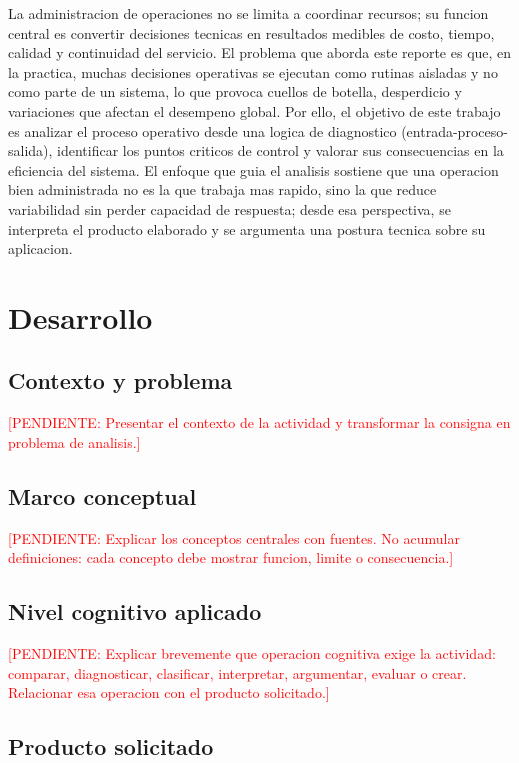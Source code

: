 \documentclass[
	spanish,
	letterpaper, oneside
]{article}
\newcommand{\pendiente}[1]{\textcolor{red}{[PENDIENTE: #1]}}
\begin{document}
La administracion de operaciones no se limita a coordinar recursos; su funcion central es convertir decisiones tecnicas en resultados medibles de costo, tiempo, calidad y continuidad del servicio. El problema que aborda este reporte es que, en la practica, muchas decisiones operativas se ejecutan como rutinas aisladas y no como parte de un sistema, lo que provoca cuellos de botella, desperdicio y variaciones que afectan el desempeno global. Por ello, el objetivo de este trabajo es analizar el proceso operativo desde una logica de diagnostico (entrada-proceso-salida), identificar los puntos criticos de control y valorar sus consecuencias en la eficiencia del sistema. El enfoque que guia el analisis sostiene que una operacion bien administrada no es la que trabaja mas rapido, sino la que reduce variabilidad sin perder capacidad de respuesta; desde esa perspectiva, se interpreta el producto elaborado y se argumenta una postura tecnica sobre su aplicacion.

\section{Desarrollo}

\subsection{Contexto y problema}

\pendiente{Presentar el contexto de la actividad y transformar la consigna en problema de analisis.}

\subsection{Marco conceptual}

\pendiente{Explicar los conceptos centrales con fuentes. No acumular definiciones: cada concepto debe mostrar funcion, limite o consecuencia.}

\subsection{Nivel cognitivo aplicado}

\pendiente{Explicar brevemente que operacion cognitiva exige la actividad: comparar, diagnosticar, clasificar, interpretar, argumentar, evaluar o crear. Relacionar esa operacion con el producto solicitado.}

\subsection{Producto solicitado}
\end{document}
